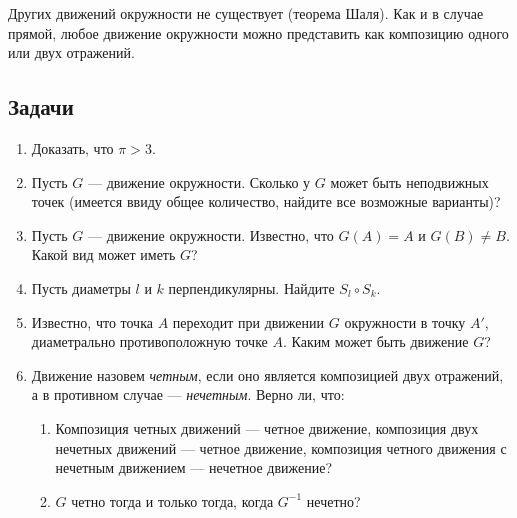 Других движений окружности не существует (теорема Шаля). Как и в случае прямой, любое движение окружности можно представить как композицию одного или двух отражений.

\subsection*{Задачи}

\begin{enumerate}
\item Доказать, что $\pi>3$.
\item Пусть $G$ --- движение окружности. Сколько у $G$ может быть неподвижных точек (имеется ввиду общее количество, найдите все возможные варианты)?
\item Пусть $G$ --- движение окружности. Известно, что $G(A)=A$ и $G(B)\ne B$. Какой вид может иметь $G$?
\item Пусть диаметры $l$ и $k$ перпендикулярны. Найдите $S_l\circ S_k$.
\item Известно, что точка $A$ переходит при движении $G$ окружности в точку $A'$, диаметрально противоположную точке $A$. Каким может быть движение $G$?
\item Движение назовем \textit{четным}, если оно является композицией двух отражений, а в противном случае --- \textit{нечетным}. Верно ли, что:
\begin{enumerate}
\item Композиция четных движений --- четное движение, композиция двух нечетных движений --- четное движение, композиция четного движения с нечетным движением --- нечетное движение?
\item $G$ четно тогда и только тогда, когда $G^{-1}$ нечетно?
\end{enumerate}
\end{enumerate}

